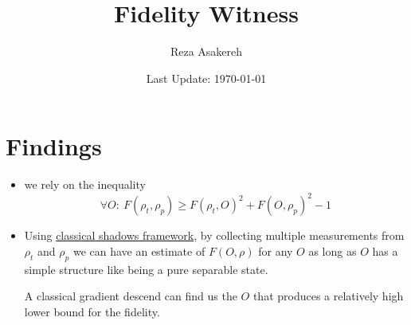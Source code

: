 \documentclass[11pt]{article}
\title{Fidelity Witness}
\author{Reza Asakereh}
\date{Last Update: \today}
\begin{document}
\maketitle

\section{Findings}
\begin{itemize}
    \item we rely on the inequality 
    $$\forall O: ~ F(\rho_t, \rho_p) \ge F(\rho_t, O)^2 + F(O, \rho_p)^2 - 1$$
    \item Using \href{https://doi.org/10.48550/arXiv.2002.08953}{classical shadows framework}, by collecting multiple measurements from $\rho_t$ and $\rho_p$ we can have an estimate of $F(O, \rho)$ for any $O$ as long as $O$ has a simple structure like being a pure separable state.
    
    A classical gradient descend can find us the $O$ that produces a relatively high lower bound for the fidelity.
\end{itemize}
\end{document}
